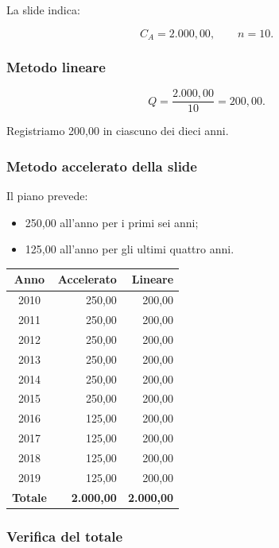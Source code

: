 \noindent La slide indica:

\[
C_A=2.000{,}00,
\qquad
n=10.
\]


\subsubsection*{Metodo lineare}

\[
Q=\frac{2.000{,}00}{10}
=
\boxed{200{,}00}.
\]

\noindent Registriamo 200,00
in ciascuno dei dieci anni.


\subsubsection*{Metodo accelerato della slide}

\noindent Il piano prevede:

\begin{itemize}
    \item 250,00 all'anno
    per i primi sei anni;

    \item 125,00 all'anno
    per gli ultimi quattro anni.
\end{itemize}

\begin{center}
    \begin{tabular}{|c|r|r|}
        \hline
        \textbf{Anno}
        & \textbf{Accelerato}
        & \textbf{Lineare} \\
        \hline
        2010 & 250,00 & 200,00 \\
        2011 & 250,00 & 200,00 \\
        2012 & 250,00 & 200,00 \\
        2013 & 250,00 & 200,00 \\
        2014 & 250,00 & 200,00 \\
        2015 & 250,00 & 200,00 \\
        2016 & 125,00 & 200,00 \\
        2017 & 125,00 & 200,00 \\
        2018 & 125,00 & 200,00 \\
        2019 & 125,00 & 200,00 \\
        \hline
        \textbf{Totale}
        & \textbf{2.000,00}
        & \textbf{2.000,00} \\
        \hline
    \end{tabular}
\end{center}


\subsubsection*{Verifica del totale}


